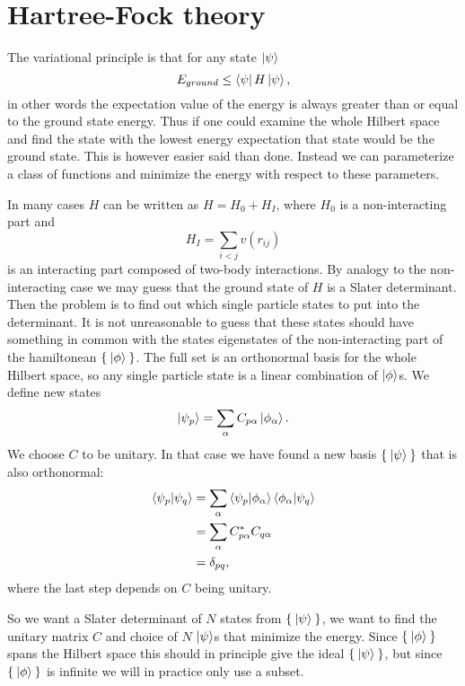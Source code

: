 \documentclass[a4paper,english,12pt]{article}
\newcommand{\bb}[1]{\boldsymbol{#1}}
\newcommand{\be}{\begin{equation}}
\newcommand{\ee}{\end{equation}}
\begin{document}
\section{Hartree-Fock theory}


The variational principle is that for any state $\ket{\psi}$
\be\label{var}
E_{ground}\leq \bra{\psi}H\ket{\psi},
\ee
in other words the expectation value of the energy is always greater than or equal to the ground state energy.
Thus if one could examine the whole Hilbert space and find the state with the lowest energy expectation that state would be the ground state.
This is however easier said than done. Instead we can parameterize a class of functions and minimize the energy with respect to these parameters.

In many cases $H$ can be written as $H = H_0 + H_I$, where $H_0$ is a non-interacting part and
\[H_I =\sum_{i<j}v(r_{ij})\]
is an interacting part composed of two-body interactions.
By analogy to the non-interacting case we may guess that the ground state of $H$ is a Slater determinant. Then the problem is to find out which
single particle states to put into the determinant. It is not unreasonable to guess that these states should have something in common with
the states eigenstates of the non-interacting part of the hamiltonean \(\Set{\Ket{\phi}}\). The full set is an orthonormal basis for the whole Hilbert space,
so any single particle state is a linear combination of $\ket{\phi}$s. We define new states
\be  \ket{\psi_p} = \sum_\alpha C_{p\alpha}\ket{\phi_\alpha}.\ee
We choose $C$ to be unitary. In that case we have found a new basis \(\Set{\Ket{\psi}}\) that is also orthonormal:
\begin{align*}
  \braket{\psi_p|\psi_q} &= \sum_\alpha\braket{\psi_p|\phi_\alpha}\braket{\phi_\alpha|\psi_q}\\
  &=\sum_{\alpha}C_{p\alpha}^*C_{q\alpha}\\
  &=\delta_{pq},
\end{align*}  
where the last step depends on $C$ being unitary.

So we want a Slater determinant of $N$ states from \(\Set{\Ket{\psi}}\), we want to find the unitary matrix $C$ and choice of $N$ $\ket{\psi}$s that minimize the
energy. Since \(\Set{\Ket{\phi}}\) spans the Hilbert space this should in principle give the ideal \(\Set{\Ket{\psi}}\), but since \(\Set{\Ket{\phi}}\)
is infinite we will in practice only use a subset.

\end{document}
